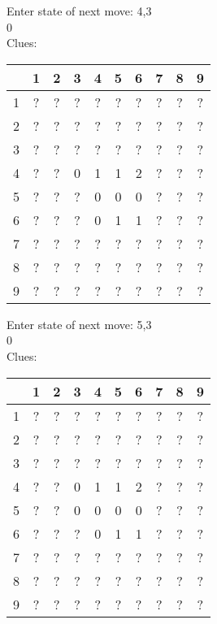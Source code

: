 Enter state of next move: 4,3\\
0\\
Clues:\\
\begin{tabular}{|c|c|c|c|c|c|c|c|c|c|}
\hline
  & 1 & 2 & 3 & 4 & 5 & 6 & 7 & 8 & 9\\
\hline
1 & ? & ? & ? & ? & ? & ? & ? & ? & ?\\
\hline
2 & ? & ? & ? & ? & ? & ? & ? & ? & ?\\
\hline
3 & ? & ? & ? & ? & ? & ? & ? & ? & ?\\
\hline
4 & ? & ? & 0 & 1 & 1 & 2 & ? & ? & ?\\
\hline
5 & ? & ? & ? & 0 & 0 & 0 & ? & ? & ?\\
\hline
6 & ? & ? & ? & 0 & 1 & 1 & ? & ? & ?\\
\hline
7 & ? & ? & ? & ? & ? & ? & ? & ? & ?\\
\hline
8 & ? & ? & ? & ? & ? & ? & ? & ? & ?\\
\hline
9 & ? & ? & ? & ? & ? & ? & ? & ? & ?\\
\hline
\end{tabular}

Enter state of next move: 5,3\\
0\\
Clues:\\
\begin{tabular}{|c|c|c|c|c|c|c|c|c|c|}
\hline
  & 1 & 2 & 3 & 4 & 5 & 6 & 7 & 8 & 9\\
\hline
1 & ? & ? & ? & ? & ? & ? & ? & ? & ?\\
\hline
2 & ? & ? & ? & ? & ? & ? & ? & ? & ?\\
\hline
3 & ? & ? & ? & ? & ? & ? & ? & ? & ?\\
\hline
4 & ? & ? & 0 & 1 & 1 & 2 & ? & ? & ?\\
\hline
5 & ? & ? & 0 & 0 & 0 & 0 & ? & ? & ?\\
\hline
6 & ? & ? & ? & 0 & 1 & 1 & ? & ? & ?\\
\hline
7 & ? & ? & ? & ? & ? & ? & ? & ? & ?\\
\hline
8 & ? & ? & ? & ? & ? & ? & ? & ? & ?\\
\hline
9 & ? & ? & ? & ? & ? & ? & ? & ? & ?\\
\hline
\end{tabular}

